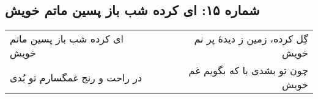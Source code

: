 \begin{center}
\section*{شماره ۱۵: ای کرده شب باز پسین ماتم خویش}
\label{sec:015}
\begin{longtable}{l p{0.5cm} r}
ای کرده شب باز پسین ماتم خویش
&&
گِل کرده، زمین ز دیدهٔ پر نم خویش
\\
در راحت و رنج غمگسارم تو بُدی
&&
چون تو بشدی با که بگویم غم خویش
\\
\end{longtable}
\end{center}
